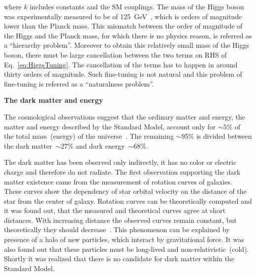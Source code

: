 where $k$ includes constants and the SM couplings. The mass of the Higgs boson was experimentally measured to be of 125~GeV~\cite{Chatrchyan:2012xdj, Aad:2012tfa}, which is orders of magnitude lower than the Planck mass. This mismatch between the order of magnitude of the Higgs and the Planck mass, for which there is no physics reason, is referred as a ``hierarchy problem''. Moreover to obtain this relatively small mass of the Higgs boson, there must be large cancellation between the two terms on RHS of Eq.~\ref{eq:HiggsTuning}. The cancellation of the terms has to happen in around thirty orders of magnitude. Such fine-tuning is not natural and this problem of fine-tuning is referred as a ``naturalness problem''.


\textbf{The dark matter and energy}

The cosmological observations suggest that the ordinary matter and energy, the matter and energy described by the Standard Model, account only for $\sim 5\%$ of the total mass~(energy) of the universe~\cite{Bertone:2004pz, Gaitskell:2004gd, Bennett:2012zja}. The remaining $\sim$95\% is divided between the dark matter~$\sim$27\% and dark energy~$\sim$68\%.

The dark matter has been observed only indirectly, it has no color or electric charge and therefore do not radiate. The first observation supporting the dark matter existence came from the measurement of rotation curves of galaxies. These curves show the dependency of star orbital velocity on the distance of the star from the center of galaxy. Rotation curves can be theoretically computed and it was found out, that the measured and theoretical curves agree at short distances. With increasing distance the observed curves remain constant, but theoretically they should decrease~\cite{Bertone:2004pz}. This phenomenon can be explained by presence of a halo of new particles, which interact by gravitational force. It was also found out that these particles must be long-lived and non-relativistic~(cold). Shortly it was realized that there is no candidate for dark matter within the Standard Model.

